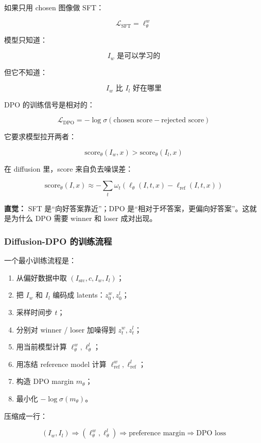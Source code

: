 如果只用 chosen 图像做 SFT：

\[
\mathcal{L}_\text{SFT}
=
\ell_\theta^w
\]

模型只知道：

\[
I_w \text{ 是可以学习的}
\]

但它不知道：

\[
I_w \text{ 比 } I_l \text{ 好在哪里}
\]

DPO 的训练信号是相对的：

\[
\mathcal{L}_\text{DPO}
=
-
\log
\sigma
\left(
\text{chosen score}
-
\text{rejected score}
\right)
\]

它要求模型拉开两者：

\[
\text{score}_\theta(I_w,x)
>
\text{score}_\theta(I_l,x)
\]

在 diffusion 里，score 来自负去噪误差：

\[
\text{score}_\theta(I,x)
\approx
-
\sum_t
\omega_t
\left(
\ell_\theta(I,t,x)-\ell_\text{ref}(I,t,x)
\right)
\]

\begin{intubox}
\textbf{直觉：} SFT 是“向好答案靠近”；DPO 是“相对于坏答案，更偏向好答案”。这就是为什么 DPO 需要 winner 和 loser 成对出现。
\end{intubox}

\subsubsection{Diffusion-DPO 的训练流程}

一个最小训练流程是：

\begin{enumerate}[leftmargin=1.5em]
  \item 从偏好数据中取 $(I_\text{src},c,I_w,I_l)$；
  \item 把 $I_w$ 和 $I_l$ 编码成 latents：$z_0^w,z_0^l$；
  \item 采样时间步 $t$；
  \item 分别对 winner / loser 加噪得到 $z_t^w,z_t^l$；
  \item 用当前模型计算 $\ell_\theta^w,\ell_\theta^l$；
  \item 用冻结 reference model 计算 $\ell_\text{ref}^w,\ell_\text{ref}^l$；
  \item 构造 DPO margin $m_\theta$；
  \item 最小化 $-\log\sigma(m_\theta)$。
\end{enumerate}

压缩成一行：

\[
(I_w,I_l)
\Rightarrow
(\ell_\theta^w,\ell_\theta^l)
\Rightarrow
\text{preference margin}
\Rightarrow
\text{DPO loss}
\]

